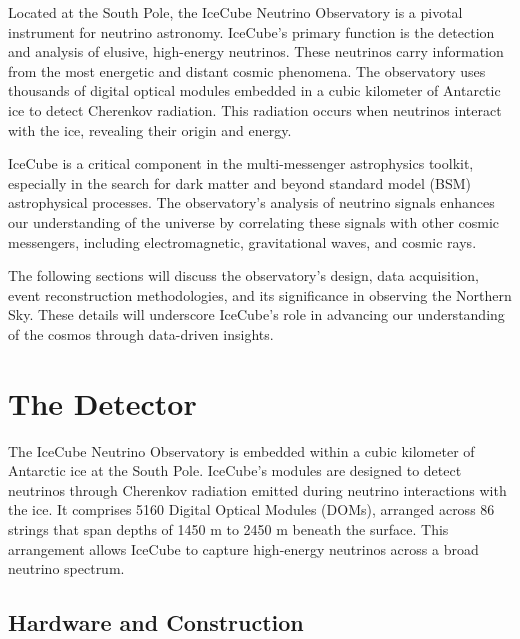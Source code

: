 
Located at the South Pole, the IceCube Neutrino Observatory is a pivotal instrument for neutrino astronomy.
IceCube's primary function is the detection and analysis of elusive, high-energy neutrinos.
These neutrinos carry information from the most energetic and distant cosmic phenomena.
The observatory uses thousands of digital optical modules embedded in a cubic kilometer of Antarctic ice to detect Cherenkov radiation.
This radiation occurs when neutrinos interact with the ice, revealing their origin and energy.

IceCube is a critical component in the multi-messenger astrophysics toolkit, especially in the search for dark matter and beyond standard model (BSM) astrophysical processes.
The observatory's analysis of neutrino signals enhances our understanding of the universe by correlating these signals with other cosmic messengers, including electromagnetic, gravitational waves, and cosmic rays.

The following sections will discuss the observatory's design, data acquisition, event reconstruction methodologies, and its significance in observing the Northern Sky.
These details will underscore IceCube's role in advancing our understanding of the cosmos through data-driven insights.

\section{The Detector}

The IceCube Neutrino Observatory is embedded within a cubic kilometer of Antarctic ice at the South Pole.
IceCube's modules are designed to detect neutrinos through Cherenkov radiation emitted during neutrino interactions with the ice.
It comprises 5160 Digital Optical Modules (DOMs), arranged across 86 strings that span depths of 1450 m to 2450 m beneath the surface.
This arrangement allows IceCube to capture high-energy neutrinos across a broad neutrino spectrum.

\subsection{Hardware and Construction}

